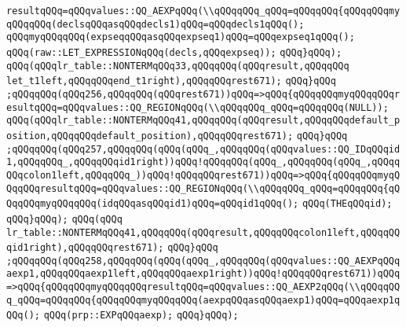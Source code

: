 \verb|resultqQQq=qQQqvalues::QQ_AEXPqQQq(\\qQQqqQQq_qQQq=qQQqqQQq{qQQqqQQqmyqQQqqQQq(declsqQQqasqQQqdecls1)qQQq=qQQqdecls1qQQq();|\newline
\verb|qQQqmyqQQqqQQq(expseqqQQqasqQQqexpseq1)qQQq=qQQqexpseq1qQQq();|\newline
\verb|qQQq(raw::LET_EXPRESSIONqQQq(decls,qQQqexpseq));|\newline
\verb|qQQq}qQQq);|\newline
\verb|qQQq(qQQqlr_table::NONTERMqQQq33,qQQqqQQq(qQQqresult,qQQqqQQq|\newline
\verb|let_t1left,qQQqqQQqend_t1right),qQQqqQQqrest671);|\newline
\verb|qQQq}qQQq|\newline
\verb|;qQQqqQQq(qQQq256,qQQqqQQq(qQQqrest671))qQQq=>qQQq{qQQqqQQqmyqQQqqQQqresultqQQq=qQQqvalues::QQ_REGIONqQQq(\\qQQqqQQq_qQQq=qQQqqQQq(NULL));|\newline
\verb|qQQq(qQQqlr_table::NONTERMqQQq41,qQQqqQQq(qQQqresult,qQQqqQQqdefault_position,qQQqqQQqdefault_position),qQQqqQQqrest671);|\newline
\verb|qQQq}qQQq|\newline
\verb|;qQQqqQQq(qQQq257,qQQqqQQq(qQQq(qQQq_,qQQqqQQq(qQQqvalues::QQ_IDqQQqid1,qQQqqQQq_,qQQqqQQqid1right))qQQq!qQQqqQQq(qQQq_,qQQqqQQq(qQQq_,qQQqqQQqcolon1left,qQQqqQQq_))qQQq!qQQqqQQqrest671))qQQq=>qQQq{qQQqqQQqmyqQQqqQQqresultqQQq=qQQqvalues::QQ_REGIONqQQq(\\qQQqqQQq_qQQq=qQQqqQQq{qQQqqQQqmyqQQqqQQq(idqQQqasqQQqid1)qQQq=qQQqid1qQQq();|\newline
\verb|qQQq(THEqQQqid);|\newline
\verb|qQQq}qQQq);|\newline
\verb|qQQq(qQQq|\newline
\verb|lr_table::NONTERMqQQq41,qQQqqQQq(qQQqresult,qQQqqQQqcolon1left,qQQqqQQqid1right),qQQqqQQqrest671);|\newline
\verb|qQQq}qQQq|\newline
\verb|;qQQqqQQq(qQQq258,qQQqqQQq(qQQq(qQQq_,qQQqqQQq(qQQqvalues::QQ_AEXPqQQqaexp1,qQQqqQQqaexp1left,qQQqqQQqaexp1right))qQQq!qQQqqQQqrest671))qQQq=>qQQq{qQQqqQQqmyqQQqqQQqresultqQQq=qQQqvalues::QQ_AEXP2qQQq(\\qQQqqQQq_qQQq=qQQqqQQq{qQQqqQQqmyqQQqqQQq(aexpqQQqasqQQqaexp1)qQQq=qQQqaexp1qQQq();|\newline
\verb|qQQq(prp::EXPqQQqaexp);|\newline
\verb|qQQq}qQQq);|\newline

